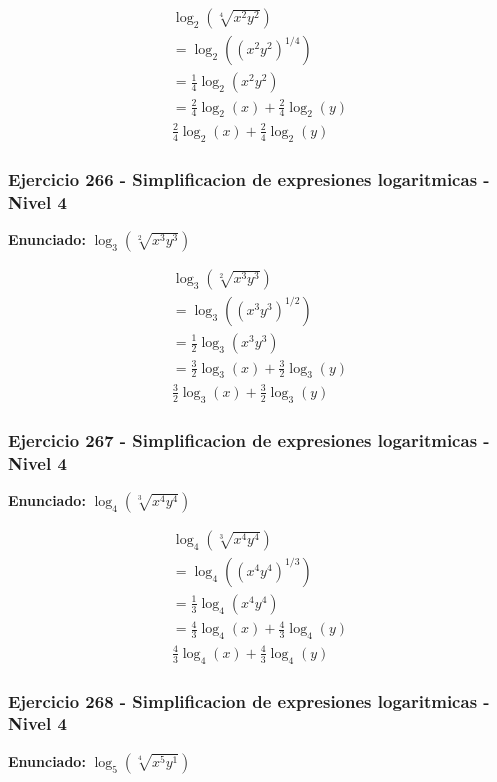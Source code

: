 \documentclass[12pt,a4paper]{article}
\begin{document}
\[
\begin{aligned}
\log_{2}\left(\sqrt[4]{x^{2}y^{2}}\right)\\
=\log_{2}\left((x^{2}y^{2})^{1/4}\right)\\
=\frac{1}{4}\log_{2}\left(x^{2}y^{2}\right) \\
=\frac{2}{4}\log_{2}\left(x\right)+\frac{2}{4}\log_{2}\left(y\right)\\
\boxed{\frac{2}{4}\log_{2}\left(x\right)+\frac{2}{4}\log_{2}\left(y\right)}
\end{aligned}
\]


\subsubsection*{Ejercicio 266 - Simplificacion de expresiones logaritmicas - Nivel 4}
\textbf{Enunciado:} \(\log_{3}\left(\sqrt[2]{x^{3}y^{3}}\right)\)

\[
\begin{aligned}
\log_{3}\left(\sqrt[2]{x^{3}y^{3}}\right)\\
=\log_{3}\left((x^{3}y^{3})^{1/2}\right)\\
=\frac{1}{2}\log_{3}\left(x^{3}y^{3}\right) \\
=\frac{3}{2}\log_{3}\left(x\right)+\frac{3}{2}\log_{3}\left(y\right)\\
\boxed{\frac{3}{2}\log_{3}\left(x\right)+\frac{3}{2}\log_{3}\left(y\right)}
\end{aligned}
\]


\subsubsection*{Ejercicio 267 - Simplificacion de expresiones logaritmicas - Nivel 4}
\textbf{Enunciado:} \(\log_{4}\left(\sqrt[3]{x^{4}y^{4}}\right)\)

\[
\begin{aligned}
\log_{4}\left(\sqrt[3]{x^{4}y^{4}}\right)\\
=\log_{4}\left((x^{4}y^{4})^{1/3}\right)\\
=\frac{1}{3}\log_{4}\left(x^{4}y^{4}\right) \\
=\frac{4}{3}\log_{4}\left(x\right)+\frac{4}{3}\log_{4}\left(y\right)\\
\boxed{\frac{4}{3}\log_{4}\left(x\right)+\frac{4}{3}\log_{4}\left(y\right)}
\end{aligned}
\]


\subsubsection*{Ejercicio 268 - Simplificacion de expresiones logaritmicas - Nivel 4}
\textbf{Enunciado:} \(\log_{5}\left(\sqrt[4]{x^{5}y^{1}}\right)\)
\end{document}
